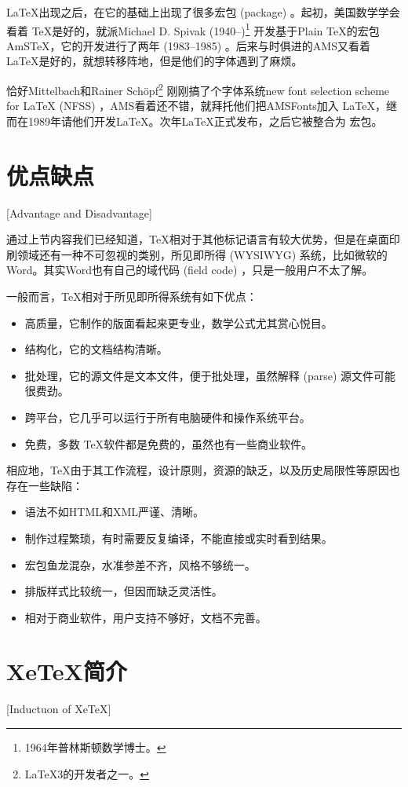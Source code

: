 \LaTeX 出现之后，在它的基础上出现了很多宏包 (package) 。起初，美国数学学会 {} 看着 \TeX 是好的，就派Michael D. Spivak (1940--)\footnote{1964年普林斯顿数学博士。} 开发基于Plain \TeX 的宏包AmS\TeX{}，它的开发进行了两年 (1983--1985) 。后来与时俱进的AMS又看着 \LaTeX 是好的，就想转移阵地，但是他们的字体遇到了麻烦。

恰好Mittelbach和Rainer Schöpf\footnote{\LaTeX 3的开发者之一。} 刚刚搞了个字体系统new font selection scheme for \LaTeX{} (NFSS) ，AMS看着还不错，就拜托他们把AMSFonts加入 \LaTeX，继而在1989年请他们开发\AmS\LaTeX{}。次年\AmS\LaTeX 正式发布，之后它被整合为 \AmS 宏包。

\section{优点缺点}[Advantage and Disadvantage]

通过上节内容我们已经知道，\TeX 相对于其他标记语言有较大优势，但是在桌面印刷领域还有一种不可忽视的类别，所见即所得 (WYSIWYG) 系统，比如微软的Word。其实Word也有自己的域代码 (field code) ，只是一般用户不太了解。

一般而言，\TeX 相对于所见即所得系统有如下优点：
\begin{itemize}
  \item  高质量，它制作的版面看起来更专业，数学公式尤其赏心悦目。
  \item  结构化，它的文档结构清晰。
  \item  批处理，它的源文件是文本文件，便于批处理，虽然解释 (parse) 源文件可能很费劲。
  \item  跨平台，它几乎可以运行于所有电脑硬件和操作系统平台。
  \item  免费，多数 \TeX 软件都是免费的，虽然也有一些商业软件。
\end{itemize}

相应地，\TeX 由于其工作流程，设计原则，资源的缺乏，以及历史局限性等原因也存在一些缺陷：
\begin{itemize}
  \item  语法不如HTML和XML严谨、清晰。
  \item  制作过程繁琐，有时需要反复编译，不能直接或实时看到结果。
  \item  宏包鱼龙混杂，水准参差不齐，风格不够统一。
  \item  排版样式比较统一，但因而缺乏灵活性。
  \item  相对于商业软件，用户支持不够好，文档不完善。
\end{itemize}


\section{XeTeX简介}[Inductuon of XeTeX]

